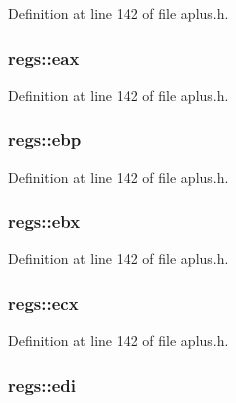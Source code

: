 Definition at line 142 of file aplus.\+h.

\hypertarget{structregs_a8fa1f22a8e8ac6908cc7710c8396f9dc}{
\subsubsection[{eax}]{ regs\+::eax}}\label{structregs_a8fa1f22a8e8ac6908cc7710c8396f9dc}


Definition at line 142 of file aplus.\+h.

\hypertarget{structregs_a1b38213d82714658dfd95ba5427f7f7b}{
\subsubsection[{ebp}]{ regs\+::ebp}}\label{structregs_a1b38213d82714658dfd95ba5427f7f7b}


Definition at line 142 of file aplus.\+h.

\hypertarget{structregs_a41a7a63387c4bb590af33d8ee3cb5a42}{
\subsubsection[{ebx}]{ regs\+::ebx}}\label{structregs_a41a7a63387c4bb590af33d8ee3cb5a42}


Definition at line 142 of file aplus.\+h.

\hypertarget{structregs_a63c6a54e49cb7c0035440d0fda58a63b}{
\subsubsection[{ecx}]{ regs\+::ecx}}\label{structregs_a63c6a54e49cb7c0035440d0fda58a63b}


Definition at line 142 of file aplus.\+h.

\hypertarget{structregs_a2b436d52440963797508f228cd45c207}{
\subsubsection[{edi}]{ regs\+::edi}}\label{structregs_a2b436d52440963797508f228cd45c207}



